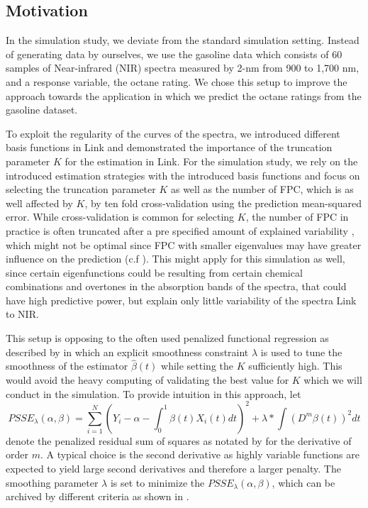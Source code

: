 \documentclass[11pt,twoside,a4paper]{article}
\begin{document}
	\subsection{Motivation}
	
	
	
	In the simulation study, we deviate from the standard simulation setting. Instead of generating data by ourselves, we use the gasoline data which consists of 60 samples of Near-infrared (NIR) spectra measured by 2-nm from 900 to 1,700 nm, and a response variable,  the octane rating. We chose this setup to improve the approach towards the application in which we  predict the octane ratings from the gasoline dataset.	
	
	
	 To exploit the regularity of the curves of the spectra, we introduced different basis functions in {\color{green} Link} and demonstrated the importance of the truncation parameter $K$ for the estimation in {\color{green} Link}. For the simulation study, we rely on the introduced estimation strategies with the introduced basis functions and focus on selecting the truncation parameter $K$ as well as the number of FPC, which is as well affected by $K$, by ten fold cross-validation using the prediction mean-squared error. While cross-validation is common for selecting $K$, the number of FPC in practice is often truncated after a pre specified amount of explained variability \cite{kokoszka_introduction_2017}, which might not be optimal since FPC with smaller eigenvalues may have greater influence on the prediction (c.f \cite{Jolliffe_1982}). This might apply for this simulation as well, since certain eigenfunctions could be resulting from certain chemical combinations and overtones in the absorption bands of the spectra, that could have high predictive power, but explain only little variability of the spectra {\color{green} Link to NIR}.
	 
	 This setup is opposing to the often used penalized functional regression as described by \cite{Goldsmith_2011} in which an explicit smoothness constraint $\lambda$ is used to tune the smoothness of the estimator $\hat{\beta}(t)$ while setting the $K$ sufficiently high. This would avoid the heavy computing of validating the best value for $K$ which we will conduct in the simulation. To provide intuition in this approach, let 
	 \begin{equation}
	 	PSSE_\lambda(\alpha, \beta) = \sum_{i = 1}^{N} (Y_i -\alpha -\int_0^1 \beta(t)X_i(t)dt)^2 + \lambda * \int (D^m\beta(t))^2 dt
	 \end{equation}
	 denote the penalized residual sum of squares as notated by \cite{ramsay_functional_2005} for the derivative of order $m$. A typical choice is the second derivative as highly variable functions are expected to yield large second derivatives and therefore a larger penalty. The smoothing parameter $\lambda$ is set to minimize the $PSSE_\lambda(\alpha, \beta)$, which can be archived by different criteria as shown in \cite{ThomasLee_2003}.
	 
\end{document}
